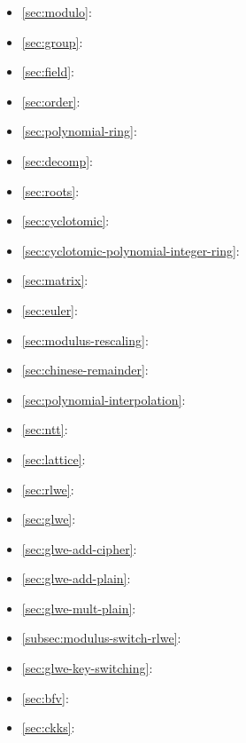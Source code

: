 \begin{itemize}
\item \autoref{sec:modulo}: 
\item \autoref{sec:group}: 
\item \autoref{sec:field}: 
\item \autoref{sec:order}: 
\item \autoref{sec:polynomial-ring}: 
\item \autoref{sec:decomp}: 
\item \autoref{sec:roots}: 
\item \autoref{sec:cyclotomic}: 
\item \autoref{sec:cyclotomic-polynomial-integer-ring}: 
\item \autoref{sec:matrix}: 
\item \autoref{sec:euler}: 
\item \autoref{sec:modulus-rescaling}: 
\item \autoref{sec:chinese-remainder}: 
\item \autoref{sec:polynomial-interpolation}: 
\item \autoref{sec:ntt}: 
\item \autoref{sec:lattice}: 
\item \autoref{sec:rlwe}: 
\item \autoref{sec:glwe}: 
\item \autoref{sec:glwe-add-cipher}: 
\item \autoref{sec:glwe-add-plain}: 
\item \autoref{sec:glwe-mult-plain}: 
\item \autoref{subsec:modulus-switch-rlwe}: 
\item \autoref{sec:glwe-key-switching}: 
\item \autoref{sec:bfv}: 
\item \autoref{sec:ckks}: 
\end{itemize}


